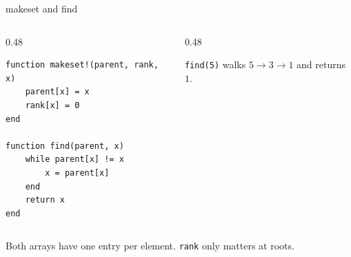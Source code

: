 \documentclass[10pt,aspectratio=169]{beamer}
\begin{document}
\begin{frame}[fragile]{makeset and find}
  \begin{columns}[c]
    \begin{column}{0.48\textwidth}
\begin{lstlisting}
function makeset!(parent, rank, x)
    parent[x] = x
    rank[x] = 0
end

function find(parent, x)
    while parent[x] != x
        x = parent[x]
    end
    return x
end
\end{lstlisting}
    \end{column}
    \begin{column}{0.48\textwidth}
      \begin{center}
      \end{center}
      \small \texttt{find(5)} walks $5 \to 3 \to 1$ and returns $1$.
    \end{column}
  \end{columns}

  \bigskip
  Both arrays have one entry per element. \texttt{rank} only matters at
  roots.
\end{frame}
\end{document}
